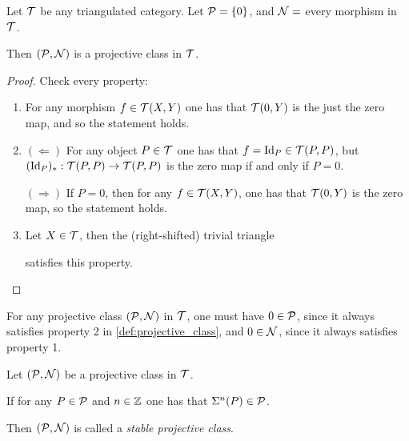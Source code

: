 \begin{example}%
    Let \( {\mathcal{T}} \) be any triangulated category. Let \( {\mathcal{P}} = \left\{0\right\} \), and \( {\mathcal{N}} = \) every morphism in \( {\mathcal{T}} \).

    Then \( ({\mathcal{P}}, {\mathcal{N}}) \) is a projective class in \( {\mathcal{T}} \).
\end{example}
\begin{proof}
    Check every property:
    \begin{enumerate}
        \item {
            For any morphism \( f \in {\mathcal{T}}(X, Y) \) one has that \( {\mathcal{T}}(0, Y) \) is the just the zero map, and so the statement holds.
        }
        \item {
            \( (\Leftarrow) \) For any object \( P \in {\mathcal{T}} \) one has that \( f = \operatorname{Id}_P \in {\mathcal{T}}(P, P) \), but \( (\operatorname{Id}_P)_*: {\mathcal{T}}(P, P) \to {\mathcal{T}}(P, P) \) is the zero map if and only if \( P = 0 \).

            \( (\Rightarrow) \) If \( P = 0 \), then for any \( f \in {\mathcal{T}}(X, Y) \), one has that \( {\mathcal{T}}(0, Y) \) is the zero map, so the statement holds. 
        }
        \item {
            Let \( X \in {\mathcal{T}} \), then the (right-shifted) trivial triangle
            \begin{center}
            \end{center}
            satisfies this property.
        }
    \end{enumerate}
\end{proof}

\begin{remark}
    For any projective class \( ( {\mathcal{P}}, {\mathcal{N}} ) \) in \( {\mathcal{T}} \), one must have \( 0 \in {\mathcal{P}} \), since it always satisfies property 2 in \autoref{def:projective_class}, and \( 0 \in {\mathcal{N}} \), since it always satisfies property 1.
\end{remark}

\begin{definition}
    Let \( ({\mathcal{P}}, {\mathcal{N}}) \) be a projective class in \( {\mathcal{T}} \).

    If for any \( P \in {\mathcal{P}} \) and \( n \in {\mathbb{Z}} \) one has that \( \Sigma^n(P) \in {\mathcal{P}} \).
    
    Then \( ({\mathcal{P}}, {\mathcal{N}}) \) is called a \emph{stable projective class}.
\end{definition}

